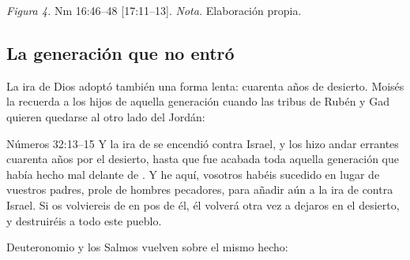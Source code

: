 \begin{center}
\par
{\footnotesize\color{gris}\textit{Figura 4.} Nm 16:46--48 [17:11--13]. \textit{Nota.} Elaboración propia.}
\end{center}


\subsection{La generación que no entró}
La ira de Dios adoptó también una forma lenta: cuarenta años de desierto. Moisés la recuerda a los hijos de aquella generación cuando las tribus de Rubén y Gad quieren quedarse al otro lado del Jordán:

\begin{verso}{Números 32:13–15}
Y la ira de \SENOR{} se encendió contra Israel, y los hizo andar errantes cuarenta años por el desierto, hasta que fue acabada toda aquella generación que había hecho mal delante de \SENOR. Y he aquí, vosotros habéis sucedido en lugar de vuestros padres, prole de hombres pecadores, para añadir aún a la ira de \SENOR{} contra Israel. Si os volviereis de en pos de él, él volverá otra vez a dejaros en el desierto, y destruiréis a todo este pueblo.
\end{verso}

Deuteronomio y los Salmos vuelven sobre el mismo hecho:


